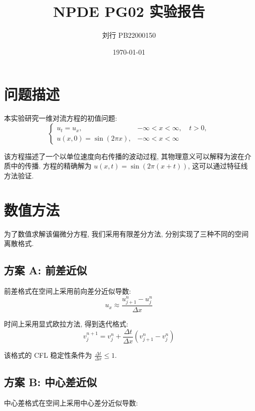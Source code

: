 \documentclass[12pt]{article}
\title{NPDE PG02 实验报告}
\author{刘行 PB22000150}
\date{\today}
\begin{document}
    \maketitle

    \section{问题描述}
        本实验研究一维对流方程的初值问题:
        \begin{equation*}
            \begin{cases}
                u_t = u_x, & -\infty < x < \infty, \quad t > 0, \\
                u(x, 0) = \sin(2\pi x), & -\infty < x < \infty
            \end{cases}
        \end{equation*}

        该方程描述了一个以单位速度向右传播的波动过程, 其物理意义可以解释为波在介质中的传播. 方程的精确解为 $u(x, t) = \sin(2\pi (x + t))$, 这可以通过特征线方法验证.

    \section{数值方法}
        为了数值求解该偏微分方程, 我们采用有限差分方法, 分别实现了三种不同的空间离散格式.

        \subsection{方案 A: 前差近似}
            前差格式在空间上采用前向差分近似导数:
            \begin{equation*}
                u_x \approx \frac{u_{j+1}^n - u_j^n}{\Delta x}
            \end{equation*}

            时间上采用显式欧拉方法, 得到迭代格式:
            \begin{equation*}
                v_j^{n+1} = v_j^n + \frac{\Delta t}{\Delta x}(v_{j+1}^n - v_j^n)
            \end{equation*}

        该格式的 CFL 稳定性条件为 $\frac{\Delta t}{\Delta x} \leq 1$.

        \subsection{方案 B: 中心差近似}

            中心差格式在空间上采用中心差分近似导数:
\end{document}
